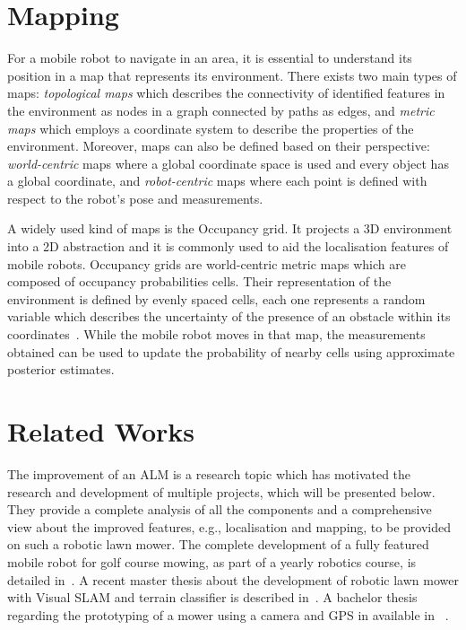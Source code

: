 \section{Mapping}

\noindent For a mobile robot to navigate in an area, it is essential to understand its position in a map that represents its environment.
There exists two main types of maps: \textit{topological maps} which describes the connectivity
of identified features in the environment as nodes in a graph connected by paths as edges, and \textit{metric maps} which employs a coordinate system to describe the properties of the environment.
Moreover, maps can also be defined based on their perspective: \textit{world-centric} maps where a global coordinate space is used and every object has a global coordinate, and \textit{robot-centric} maps where each point is defined with respect to the robot's pose and measurements.

A widely used kind of maps is the Occupancy grid.
It projects a \gls{3D} environment into a \gls{2D} abstraction and it is commonly used to aid the localisation features of mobile robots.
Occupancy grids are world-centric metric maps which are composed of occupancy probabilities cells.
Their representation of the environment is defined by evenly spaced cells, each one represents a random variable which describes the uncertainty of the presence of an obstacle within its coordinates~\cite{thrun_probabilistic_2005}.
While the mobile robot moves in that map, the measurements obtained can be used to update the probability of nearby cells using approximate posterior estimates.



\section{Related Works}

\noindent
The improvement of an \gls{ALM} is a research topic which has motivated the research and development of multiple projects, which will be presented below.
They provide a complete analysis of all the components and a comprehensive view about the improved features, e.g., localisation and mapping, to be provided on such a robotic lawn mower.
The complete development of a fully featured mobile robot for golf course mowing, as part of a yearly robotics course, is detailed in~\cite{noauthor_groundsbot_nodate}.
A recent master thesis about the development of robotic lawn mower with Visual SLAM and terrain classifier is described in~\cite{lukas_robotic_2020}.
A bachelor thesis regarding the prototyping of a mower using a camera and GPS in available in~ \cite{andersson_smart_2018}.

